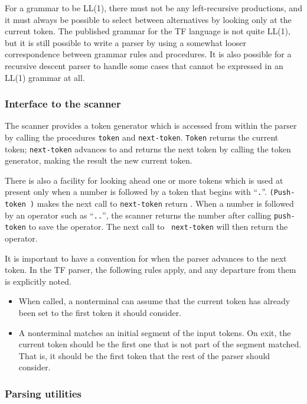 For a grammar to be LL(1), there must not be any left-recursive
productions, and it must always be possible to select between
alternatives by looking only at the current token.  The published
grammar for the TF language is not quite LL(1), but it is still
possible to write a parser by using a somewhat looser correspondence
between grammar rules and procedures.  It is also possible for a
recursive descent parser to handle some cases that cannot be expressed
in an LL(1) grammar at all.


\subsubsection{Interface to the scanner}

The scanner provides a token generator which is accessed from within
the parser by calling the procedures {\tt token} and {\tt next-token}.
{\tt Token} returns the current token; {\tt next-token} advances to
and returns the next token by calling the token generator, making the
result the new current token.  

There is also a facility for looking ahead one or more tokens which is
used at present only when a number is followed by a token that begins
with ``{\tt .}''.  {\tt (Push-token )} makes the next call to
{\tt next-token} return .  When a number is followed by an
operator such as ``{\tt ..}'', the scanner returns the number after
calling {\tt push-token} to save the operator.  The next call to {\tt
next-token} will then return the operator.

It is important to have a convention for when the parser advances
to the next token.  In the TF parser, the following rules apply,
and any departure from them is explicitly noted.

\begin{itemize}
\item When called, a nonterminal can assume that the current token
      has already been set to the first token it should consider.
\item A nonterminal matches an initial segment of the input tokens.
      On exit, the current token should be the first one that is
      not part of the segment matched.  That is, it should be the
      first token that the rest of the parser should consider.
\end{itemize}


\subsubsection{Parsing utilities}


